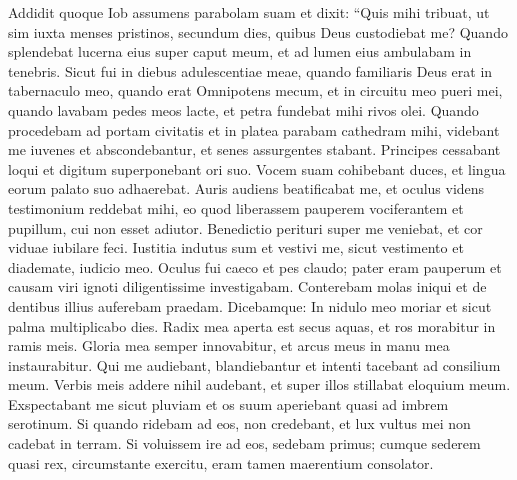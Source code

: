 \begin{biblechapter}  
\verse Addidit quoque Iob assumens parabolam suam et dixit: 
\verse “Quis mihi tribuat, ut sim iuxta menses pristinos, secundum dies, quibus Deus custodiebat me? 
\verse Quando splendebat lucerna eius super caput meum, et ad lumen eius ambulabam in tenebris. 
\verse Sicut fui in diebus adulescentiae meae, quando familiaris Deus erat in tabernaculo meo, 
\verse quando erat Omnipotens mecum, et in circuitu meo pueri mei, 
\verse quando lavabam pedes meos lacte, et petra fundebat mihi rivos olei. 
\verse Quando procedebam ad portam civitatis et in platea parabam cathedram mihi, 
\verse videbant me iuvenes et abscondebantur, et senes assurgentes stabant. 
\verse Principes cessabant loqui et digitum superponebant ori suo. 
\verse Vocem suam cohibebant duces, et lingua eorum palato suo adhaerebat. 
\verse Auris audiens beatificabat me, et oculus videns testimonium reddebat mihi, 
\verse eo quod liberassem pauperem vociferantem et pupillum, cui non esset adiutor. 
\verse Benedictio perituri super me veniebat, et cor viduae iubilare feci. 
\verse Iustitia indutus sum et vestivi me, sicut vestimento et diademate, iudicio meo. 
\verse Oculus fui caeco et pes claudo; 
\verse pater eram pauperum et causam viri ignoti diligentissime investigabam. 
\verse Conterebam molas iniqui et de dentibus illius auferebam praedam. 
\verse Dicebamque: In nidulo meo moriar et sicut palma multiplicabo dies. 
\verse Radix mea aperta est secus aquas, et ros morabitur in ramis meis. 
\verse Gloria mea semper innovabitur, et arcus meus in manu mea instaurabitur. 
\verse Qui me audiebant, blandiebantur et intenti tacebant ad consilium meum. 
\verse Verbis meis addere nihil audebant, et super illos stillabat eloquium meum. 
\verse Exspectabant me sicut pluviam et os suum aperiebant quasi ad imbrem serotinum. 
\verse Si quando ridebam ad eos, non credebant, et lux vultus mei non cadebat in terram. 
\verse Si voluissem ire ad eos, sedebam primus; cumque sederem quasi rex, circumstante exercitu, eram tamen maerentium consolator. 
\end{biblechapter}

